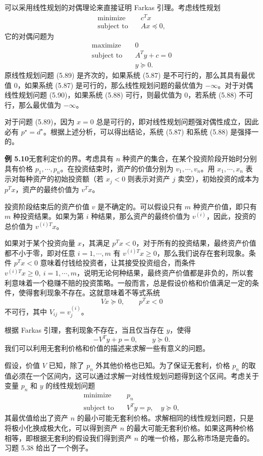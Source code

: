 \documentclass[UTF8, 12pt, fontset=fandol, oneside]{ctexart}
\begin{document}
可以采用线性规划的对偶理论来直接证明 Farkas 引理。考虑线性规划
\begin{equation}
\begin{aligned}
\text{minimize}\quad & c^Tx\\
\text{subject to}\quad & Ax\preceq 0,
\end{aligned}
\tag{5.89}
\end{equation}
它的对偶问题为
\begin{equation}
\begin{aligned}
\text{maximize}\quad & 0\\
\text{subject to}\quad & A^Ty+c=0\\
& y\succeq 0.
\end{aligned}
\tag{5.90}
\end{equation}
原线性规划问题 (5.89) 是齐次的，如果系统 (5.87) 是不可行的，那么其具有最优值 0，如果系统 (5.87) 是可行的，那么线性规划问题的最优值为 $-\infty$。对于对偶线性规划问题 (5.90)，如果系统 (5.88) 可行，则最优值为 0，若系统 (5.88) 不可行，那么最优值为 $-\infty$。

对于问题 (5.89)，因为 $x=0$ 总是可行的，即对线性规划问题强对偶性成立，因此必有 $p^\star=d^\star$。根据上述分析，可以得出结论，系统 (5.87) 和系统 (5.88) 是强择一的。

\noindent\textbf{例 5.10}\quad 无套利定价的界。考虑具有 $n$ 种资产的集合，在某个投资阶段开始时分别具有价格 $p_1,\cdots,p_n$。在投资结束时，资产的价值分别为 $v_1,\cdots,v_n$。用 $x_1,\cdots,x_n$ 表示对每种资产的初始投资额（若 $x_j<0$ 则表示对资产 $j$ 卖空），初始投资的成本为 $p^Tx$，资产的最终价值为 $v^Tx$。

投资阶段结束后的资产价值 $v$ 是不确定的。可以假设只有 $m$ 种资产价值，即只有 $m$ 种投资结果。如果为第 $i$ 种结果，那么资产的最终价值为 $v^{(i)}$，因此，投资的总价值为 $v^{(i)T}x$。

如果对于某个投资向量 $x$，其满足 $p^Tx<0$，对于所有的投资结果，最终资产价值都不小于零，即对任意 $i=1,\cdots,m$ 有 $v^{(i)T}x\geq 0$，那么我们说存在套利现象。条件 $p^Tx<0$ 意味着付钱给投资者，让其接受投资组合，而条件 $v^{(i)T}x\geq 0,\ i=1,\cdots,m$，说明无论何种结果，最终资产价值都是非负的，所以套利意味着一个稳赚不赔的投资策略。一般而言，总是假设价格和价值满足一定的条件，使得套利现象不存在。这就意味着不等式系统
\[
Vx\succeq 0,\qquad p^Tx<0
\]
不可行，其中 $V_{ij}=v_j^{(i)}$。

根据 Farkas 引理，套利现象不存在，当且仅当存在 $y$，使得
\[
-V^Ty+p=0,\qquad y\succeq 0.
\]
我们可以利用无套利价格和价值的描述来求解一些有意义的问题。

假设，价值 $V$ 已知，除了 $p_n$ 外其他价格也已知。为了保证无套利，价格 $p_n$ 的取值必须在一个区间内，这可以通过求解一对线性规划问题得到这个区间。考虑关于变量 $p_n$ 和 $y$ 的线性规划问题
\[
\begin{aligned}
\text{minimize}\quad & p_n\\
\text{subject to}\quad & V^Ty=p,\quad y\succeq 0,
\end{aligned}
\]
其最优值给出了资产 $n$ 的最小可能无套利价格。求解相同的线性规划问题，只是将极小化换成极大化，可以得到资产 $n$ 的最大可能无套利价格。如果这两种价格相等，即根据无套利的假设我们得到资产 $n$ 的唯一价格，那么称市场是完备的。习题 5.38 给出了一个例子。
\end{document}

